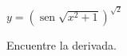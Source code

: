 \item $y = \left( \operatorname{sen} \sqrt{x^2 + 1} \right)^{\sqrt{2}}$
\par
Encuentre la derivada.
